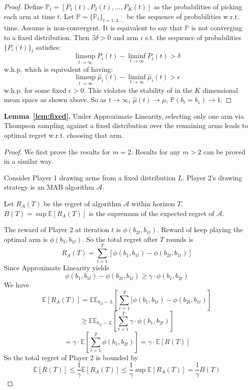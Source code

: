 \begin{proof}
Define $\mathbb{P}_t = [P_1(t), P_2(t), ..., P_K(t)]$ as the probabilities of picking each arm at time $t$. Let $\mathbb{P} = \{\mathbb{P}_t\}_{t = 1, 2, ...}$ be the sequence of probabilities w.r.t. time. 
Assume \multisparring is non-convergent. It is equivalent to say that $\mathbb{P}$ is not converging to a fixed distribution. Then $\exists \delta > 0$ and arm $i$ s.t. the sequence of probabilities $\{P_i(t)\}_t$ satisfies:
$$\limsup_{t \rightarrow \infty} P_i(t) - \liminf_{t \rightarrow \infty} P_i(t) > \delta$$
w.h.p. which is equivalent of having:
$$\limsup_{t \rightarrow \infty} \hat{\mu}_i(t) - \liminf_{t \rightarrow \infty} \hat{\mu}_i(t) > \epsilon$$
w.h.p. for some fixed $\epsilon > 0$. This violates the stability of \multisparring in the $K$ dimensional mean space as shown above. So as $t\rightarrow \infty$,   $\hat{\mu}(t) \rightarrow \mu$, $\mathbb{P}(b_t = b_1) \rightarrow 1$.

\end{proof}

\textbf{Lemma~\ref{lem:fixed}.}
Under Approximate Linearity, selecting only one arm  via Thompson sampling against a fixed distribution over the remaining arms leads to optimal regret w.r.t. choosing that arm.
\begin{proof}
We first prove the results for $m = 2$. Results for any $m > 2$ can be proved in a similar way.

Consider Player 1 drawing arms from a fixed distribution $L$. Player 2's drawing strategy is an MAB algorithm $\mathcal{A}$.

Let $R_A(T)$ be the regret of algorithm $\mathcal{A}$ within horizon $T$. $B(T) = \sup \mathbb{E}[R_A(T)]$ is the supremum of the expected regret of $\mathcal{A}$. 

The reward of Player 2 at iteration $t$ is $\phi (b_{2t}, b_{1t})$. Reward of keep playing the optimal arm is $\phi (b_1, b_{1t})$. So the total regret after $T$ rounds is 
$$R_A(T) = \sum_{t=1}^{T} [\phi (b_1, b_{1t}) - \phi (b_{2t}, b_{1t})]$$
Since Approximate Linearity yields
$$\phi (b_1, b_{1t}) - \phi (b_{2t}, b_{1t}) \geq \gamma \cdot \phi(b_1, b_{2t})$$
We have
$$\mathbb{E}[R_A(T)] = \mathbb{E}\mathbb{E}_{b_{1t}\sim L}\left[\sum_{t=1}^{T} [\phi (b_1, b_{1t}) - \phi (b_{2t}, b_{1t})\right]$$
$$\geq \mathbb{E}\mathbb{E}_{b_{1t}\sim L} \left[\sum_{t=1}^{T} \gamma \cdot \phi(b_1, b_{2t})\right] $$ 
$$= \gamma \cdot \mathbb{E} \left[ \sum_{t=1}^{T}\phi(b_1, b_{2t})\right]
= \gamma \cdot \mathbb{E}[R(T)]$$
So the total regret of Player 2 is bounded by
$$\mathbb{E}[R(T)] \leq \frac{1}{\gamma} \mathbb{E}[R_A(T)] \leq \frac{1}{\gamma} \sup \mathbb{E}[R_A(T)] = \frac{1}{\gamma} B(T)$$
\end{proof}

